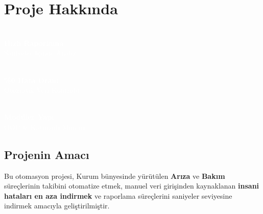 \chapter{Proje Hakkında}

\begin{center}
\begin{minipage}{0.31\textwidth}
    \begin{tcolorbox}[colback=primary,colframe=primary,arc=3pt,halign=center,top=6pt,bottom=6pt]
        \textcolor{white}{\Huge\faClock}\\[3pt]
        \textcolor{white}{\textbf{\Large Hızlı Raporlama}}\\[2pt]
        \textcolor{white}{\small Saniyeler İçinde Analiz}
    \end{tcolorbox}
\end{minipage}
\hfill
\begin{minipage}{0.31\textwidth}
    \begin{tcolorbox}[colback=secondary,colframe=secondary,arc=3pt,halign=center,top=6pt,bottom=6pt]
        \textcolor{white}{\Huge\faCheckCircle}\\[3pt]
        \textcolor{white}{\textbf{\Large \%0 Hata Oranı}}\\[2pt]
        \textcolor{white}{\small Otomatik Veri Kontrolü}
    \end{tcolorbox}
\end{minipage}
\hfill
\begin{minipage}{0.31\textwidth}
    \begin{tcolorbox}[colback=primary,colframe=primary,arc=3pt,halign=center,top=6pt,bottom=6pt]
        \textcolor{white}{\Huge\faCubes}\\[3pt]
        \textcolor{white}{\textbf{\Large Modüler Yapı}}\\[2pt]
        \textcolor{white}{\small OOP \& Katmanlı Mimari}
    \end{tcolorbox}
\end{minipage}
\end{center}

\vspace{0.5cm}

\section{Projenin Amacı}

Bu otomasyon projesi, Kurum bünyesinde yürütülen \textbf{Arıza} ve \textbf{Bakım} süreçlerinin takibini otomatize etmek, manuel veri girişinden kaynaklanan \textbf{insani hataları en aza indirmek} ve raporlama süreçlerini saniyeler seviyesine indirmek amacıyla geliştirilmiştir.

